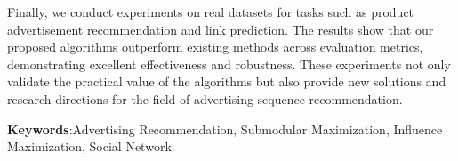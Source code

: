 Finally, we conduct experiments on real datasets for tasks such as product advertisement recommendation and link  prediction. The results show that our proposed algorithms outperform existing methods across evaluation metrics, demonstrating excellent effectiveness and robustness. These experiments not only validate the practical value of the algorithms but also provide new solutions and research directions for the field of advertising sequence recommendation.

\textbf{Keywords}:Advertising Recommendation, Submodular Maximization, Influence Maximization, Social Network.